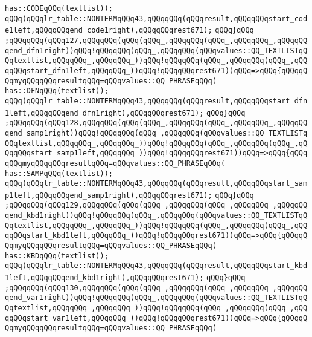 \verb|has::CODEqQQq(textlist));|\newline
\verb|qQQq(qQQqlr_table::NONTERMqQQq43,qQQqqQQq(qQQqresult,qQQqqQQqstart_code1left,qQQqqQQqend_code1right),qQQqqQQqrest671);|\newline
\verb|qQQq}qQQq|\newline
\verb|;qQQqqQQq(qQQq127,qQQqqQQq(qQQq(qQQq_,qQQqqQQq(qQQq_,qQQqqQQq_,qQQqqQQqend_dfn1right))qQQq!qQQqqQQq(qQQq_,qQQqqQQq(qQQqvalues::QQ_TEXTLISTqQQqtextlist,qQQqqQQq_,qQQqqQQq_))qQQq!qQQqqQQq(qQQq_,qQQqqQQq(qQQq_,qQQqqQQqstart_dfn1left,qQQqqQQq_))qQQq!qQQqqQQqrest671))qQQq=>qQQq{qQQqqQQqmyqQQqqQQqresultqQQq=qQQqvalues::QQ_PHRASEqQQq(|\newline
\verb|has::DFNqQQq(textlist));|\newline
\verb|qQQq(qQQqlr_table::NONTERMqQQq43,qQQqqQQq(qQQqresult,qQQqqQQqstart_dfn1left,qQQqqQQqend_dfn1right),qQQqqQQqrest671);|\newline
\verb|qQQq}qQQq|\newline
\verb|;qQQqqQQq(qQQq128,qQQqqQQq(qQQq(qQQq_,qQQqqQQq(qQQq_,qQQqqQQq_,qQQqqQQqend_samp1right))qQQq!qQQqqQQq(qQQq_,qQQqqQQq(qQQqvalues::QQ_TEXTLISTqQQqtextlist,qQQqqQQq_,qQQqqQQq_))qQQq!qQQqqQQq(qQQq_,qQQqqQQq(qQQq_,qQQqqQQqstart_samp1left,qQQqqQQq_))qQQq!qQQqqQQqrest671))qQQq=>qQQq{qQQqqQQqmyqQQqqQQqresultqQQq=qQQqvalues::QQ_PHRASEqQQq(|\newline
\verb|has::SAMPqQQq(textlist));|\newline
\verb|qQQq(qQQqlr_table::NONTERMqQQq43,qQQqqQQq(qQQqresult,qQQqqQQqstart_samp1left,qQQqqQQqend_samp1right),qQQqqQQqrest671);|\newline
\verb|qQQq}qQQq|\newline
\verb|;qQQqqQQq(qQQq129,qQQqqQQq(qQQq(qQQq_,qQQqqQQq(qQQq_,qQQqqQQq_,qQQqqQQqend_kbd1right))qQQq!qQQqqQQq(qQQq_,qQQqqQQq(qQQqvalues::QQ_TEXTLISTqQQqtextlist,qQQqqQQq_,qQQqqQQq_))qQQq!qQQqqQQq(qQQq_,qQQqqQQq(qQQq_,qQQqqQQqstart_kbd1left,qQQqqQQq_))qQQq!qQQqqQQqrest671))qQQq=>qQQq{qQQqqQQqmyqQQqqQQqresultqQQq=qQQqvalues::QQ_PHRASEqQQq(|\newline
\verb|has::KBDqQQq(textlist));|\newline
\verb|qQQq(qQQqlr_table::NONTERMqQQq43,qQQqqQQq(qQQqresult,qQQqqQQqstart_kbd1left,qQQqqQQqend_kbd1right),qQQqqQQqrest671);|\newline
\verb|qQQq}qQQq|\newline
\verb|;qQQqqQQq(qQQq130,qQQqqQQq(qQQq(qQQq_,qQQqqQQq(qQQq_,qQQqqQQq_,qQQqqQQqend_var1right))qQQq!qQQqqQQq(qQQq_,qQQqqQQq(qQQqvalues::QQ_TEXTLISTqQQqtextlist,qQQqqQQq_,qQQqqQQq_))qQQq!qQQqqQQq(qQQq_,qQQqqQQq(qQQq_,qQQqqQQqstart_var1left,qQQqqQQq_))qQQq!qQQqqQQqrest671))qQQq=>qQQq{qQQqqQQqmyqQQqqQQqresultqQQq=qQQqvalues::QQ_PHRASEqQQq(|\newline
